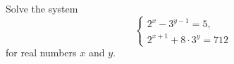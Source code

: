 Solve the system
\[\begin{cases}2^{x}-3^{y-1}=5,\\ 2^{x+1}+8\cdot3^{y}=712\end{cases}\]
for real numbers $x$ and $y$.
